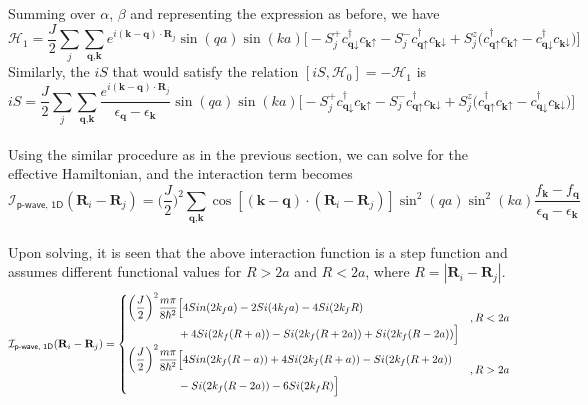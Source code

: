 \documentclass{article}
\begin{document}
Summing over $\alpha$, $\beta$ and representing the expression as before, we have
\\
\begin{equation}
\mathcal{H}_1 = \frac{J}{2} \sum_{j}\sum_{\textbf{q}, \textbf{k}}e^{i(\textbf{k}-\textbf{q}) \cdot\textbf{R}_j} \sin(qa) \sin(ka)\Big[ -S_j^+ c_{\textbf{q}\downarrow}^\dagger c_{\textbf{k}\uparrow} - S_j^- c_{\textbf{q}\uparrow}^\dagger c_{\textbf{k}\downarrow} + S_j^z \big( c_{\textbf{q}\uparrow}^\dagger c_{\textbf{k}\uparrow} - c_{\textbf{q}\downarrow}^\dagger c_{\textbf{k}\downarrow}\big)\Big]
\end{equation}
Similarly, the $iS$ that would satisfy the relation $[iS, \mathcal{H}_0] = -\mathcal{H}_1$ is 
\\
\begin{equation}
iS = \frac{J}{2} \sum_{j}\sum_{\textbf{q}, \textbf{k}}\frac{e^{i(\textbf{k}-\textbf{q}) \cdot\textbf{R}_j}}{\epsilon_\textbf{q} - \epsilon_\textbf{k}} \sin(qa)\sin(ka)\Big[ -S_j^+ c_{\textbf{q}\downarrow}^\dagger c_{\textbf{k}\uparrow} - S_j^- c_{\textbf{q}\uparrow}^\dagger c_{\textbf{k}\downarrow} + S_j^z \big( c_{\textbf{q}\uparrow}^\dagger c_{\textbf{k}\uparrow} - c_{\textbf{q}\downarrow}^\dagger c_{\textbf{k}\downarrow}\big)\Big]
\end{equation}
\\
Using the similar procedure as in the previous section, we can solve for the effective Hamiltonian, and the interaction term becomes
\\
\begin{equation}
\mathcal{I}_{\textsf{p-wave, 1D}}(\textbf{R}_i - \textbf{R}_j)  =  \Bigg(\frac{J}{2}\Bigg)^2 \sum_{\textbf{q}, \textbf{k}} \cos[(\textbf{k}-\textbf{q})\cdot(\textbf{R}_i - \textbf{R}_j)] \sin^{2}(qa) \sin^{2}(ka) \frac{f_\textbf{k} - f_\textbf{q}}{\epsilon_\textbf{q} - \epsilon_\textbf{k} }
\end{equation} 
\\
Upon solving, it is seen that the above interaction function is a step function and assumes different functional values for $R > 2a$ and $R < 2a$, where $R = |\textbf{R}_i - \textbf{R}_j|$.
\\
\begin{equation}
\mathcal{I}_{\textsf{p-wave, 1D}}(\textbf{R}_i - \textbf{R}_j) =
\begin{cases}
\centering
\begin{split}
\bigg(\frac{J}{2}\bigg)^2 \frac{m \pi}{8 \hbar^2} &\Big[ 4Sin(2k_fa) - 2Si(4k_fa) - 4Si(2k_fR) \\ &+ 4Si(2k_f(R+a)) - Si(2k_f(R+2a)) +Si(2k_f(R-2a))\Big]
 \end{split}  & , R < 2a    \\

\begin{split}
\bigg(\frac{J}{2}\bigg)^2 \frac{m \pi}{8 \hbar^2} &\Big[ 4Sin(2k_f(R-a)) + 4Si(2k_f(R+a)) - Si(2k_f(R+2a)) \\ & - Si(2k_f(R-2a)) -6Si(2k_fR)\Big]
\end{split}  & , R > 2a\\
\end{cases}
\end{equation}
\end{document}
